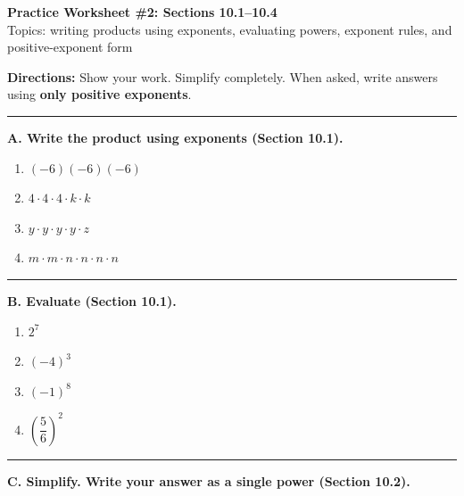 \documentclass[11pt]{article}
\begin{document}
\begin{center}
{\Large \textbf{Practice Worksheet \#2: Sections 10.1--10.4}}\\[4pt]
{\small Topics: writing products using exponents, evaluating powers, exponent rules, and positive-exponent form}
\end{center}

\textbf{Directions:} Show your work. Simplify completely. When asked, write answers using \textbf{only positive exponents}.

\vspace{0.5em}
\hrule
\vspace{0.8em}

\textbf{A. Write the product using exponents (Section 10.1).}

\begin{enumerate}[label=\arabic*.]
\item $(-6)(-6)(-6)$
\item $4\cdot 4\cdot 4\cdot k\cdot k$
\item $y\cdot y\cdot y\cdot y\cdot z$
\item $m\cdot m\cdot n\cdot n\cdot n\cdot n$
\end{enumerate}

\vspace{0.4em}
\hrule
\vspace{0.8em}

\textbf{B. Evaluate (Section 10.1).}

\begin{enumerate}[label=\arabic*., resume]
\item $2^7$
\item $(-4)^3$
\item $(-1)^8$
\item $\left(\dfrac{5}{6}\right)^2$
\end{enumerate}

\vspace{0.4em}
\hrule
\vspace{0.8em}

\textbf{C. Simplify. Write your answer as a single power (Section 10.2).}
\end{document}
